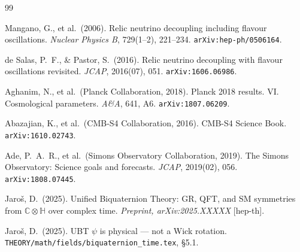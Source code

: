 \documentclass[12pt,a4paper]{article}
\theoremstyle{definition}
\theoremstyle{remark}
\newcommand{\C}{\mathbb{C}}
\renewcommand{\H}{\mathbb{H}}
\begin{document}
\begin{thebibliography}{99}

  Mangano, G., et al.\ (2006).
  Relic neutrino decoupling including flavour oscillations.
  \textit{Nuclear Physics B}, 729(1--2), 221--234.
  \texttt{arXiv:hep-ph/0506164}.

  de Salas, P.~F., \& Pastor, S.\ (2016).
  Relic neutrino decoupling with flavour oscillations revisited.
  \textit{JCAP}, 2016(07), 051.
  \texttt{arXiv:1606.06986}.

  Aghanim, N., et al.\ (Planck Collaboration, 2018).
  Planck 2018 results. VI. Cosmological parameters.
  \textit{A\&A}, 641, A6. \texttt{arXiv:1807.06209}.

  Abazajian, K., et al.\ (CMB-S4 Collaboration, 2016).
  CMB-S4 Science Book.
  \texttt{arXiv:1610.02743}.

  Ade, P.~A.~R., et al.\ (Simons Observatory Collaboration, 2019).
  The Simons Observatory: Science goals and forecasts.
  \textit{JCAP}, 2019(02), 056. \texttt{arXiv:1808.07445}.

  Jaro\v{s}, D.\ (2025).
  Unified Biquaternion Theory: GR, QFT, and SM symmetries from
  $\C\otimes\H$ over complex time.
  \textit{Preprint, arXiv:2025.XXXXX} [hep-th].

  Jaro\v{s}, D.\ (2025).
  UBT $\psi$ is physical --- not a Wick rotation.
  \texttt{THEORY/math/fields/biquaternion\_time.tex}, §5.1.

\end{thebibliography}
\end{document}
